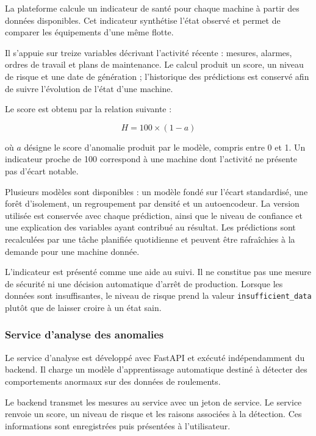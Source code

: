 La plateforme calcule un indicateur de santé pour chaque machine à partir des données disponibles. Cet indicateur synthétise l'état observé et permet de comparer les équipements d'une même flotte.

Il s'appuie sur treize variables décrivant l'activité récente : mesures, alarmes, ordres de travail et plans de maintenance. Le calcul produit un score, un niveau de risque et une date de génération ; l'historique des prédictions est conservé afin de suivre l'évolution de l'état d'une machine.

Le score est obtenu par la relation suivante :

\begin{equation}
H = 100 \times (1 - a)
\label{eq:health-score}
\end{equation}

où $a$ désigne le score d'anomalie produit par le modèle, compris entre 0 et 1. Un indicateur proche de 100 correspond à une machine dont l'activité ne présente pas d'écart notable.

Plusieurs modèles sont disponibles : un modèle fondé sur l'écart standardisé, une forêt d'isolement, un regroupement par densité et un autoencodeur. La version utilisée est conservée avec chaque prédiction, ainsi que le niveau de confiance et une explication des variables ayant contribué au résultat. Les prédictions sont recalculées par une tâche planifiée quotidienne et peuvent être rafraîchies à la demande pour une machine donnée.

L'indicateur est présenté comme une aide au suivi. Il ne constitue pas une mesure de sécurité ni une décision automatique d'arrêt de production. Lorsque les données sont insuffisantes, le niveau de risque prend la valeur \texttt{insufficient\_data} plutôt que de laisser croire à un état sain.

\subsubsection{Service d'analyse des anomalies}

Le service d'analyse est développé avec FastAPI et exécuté indépendamment du backend. Il charge un modèle d'apprentissage automatique destiné à détecter des comportements anormaux sur des données de roulements.

Le backend transmet les mesures au service avec un jeton de service. Le service renvoie un score, un niveau de risque et les raisons associées à la détection. Ces informations sont enregistrées puis présentées à l'utilisateur.

